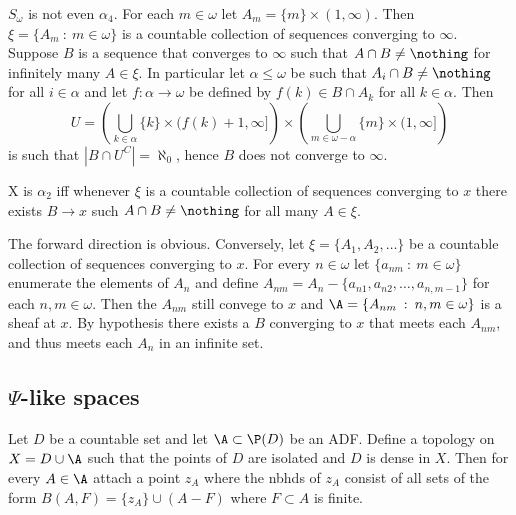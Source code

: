 \documentclass{article}
\begin{document}
\begin{exam}
    \(S_{\omega}\) is not even \(\alpha_4\). For each \(m \in \omega\) let \(A_m = \{m\} \times (1, \infty)\). Then \(\xi = \{A_m \: : \: m \in \omega\}\) is a countable collection of sequences converging to \(\infty\). Suppose \(B\) is a sequence that converges to \(\infty\) such that \(A\cap B \neq \nothing\) for infinitely many \(A \in \xi\). In particular let \(\alpha \leq \omega\) be such that \(A_i \cap B \neq \nothing\) for all \(i \in \alpha\) and let \(f:\alpha \to \omega\) be defined by \(f(k) \in B \cap A_k\) for all \(k \in \alpha\). Then 
    \[
    U = \left(\bigcup_{k \in \alpha} \{k\} \times (f(k) + 1, \infty]\right)\times \left(\bigcup_{m \in \omega-\alpha} \{m\} \times (1, \infty]\right)\] 
    is such that \(|B \cap U^C| = \aleph_0\), hence \(B\) does not converge to \(\infty\). 

\end{exam}

\begin{exercise}{\label{var_alpha2}}
    X is \(\alpha_2\) iff whenever \(\xi\) is a countable collection of sequences converging to \(x\) there exists \(B \to x\) such \(A \cap B \neq \nothing\) for all many \(A \in \xi\).
\end{exercise}
\begin{soln}
    The forward direction is obvious. Conversely, let \(\xi =\{A_1, A_2, \dots\}\) be a countable collection of sequences converging to \(x\). For every \(n\in \omega\) let \(\{a_{nm} \: : \: m \in \omega\}\) enumerate the elements of \(A_n\) and define \(A_{nm} = A_n - \{a_{n1}, a_{n2}, \dots, a_{n,m-1}\}\) for each \(n,m \in \omega\). Then the \(A_{nm}\) still convege to \(x\) and  \(\A = \{A_{nm} \: : \: n,m \in \omega \}\) is a sheaf at \(x\). By hypothesis there exists a \(B\) converging to \(x\) that meets each \(A_{nm}\), and thus meets each \(A_n\) in an infinite set.
\end{soln}

\subsection{\(\Psi\)-like spaces}

\begin{defn}
    Let \(D\) be a countable set and let \(\A \subset \P(D)\) be an ADF. Define a topology on \(X = D \cup \A\) such that the points of \(D\) are isolated and \(D\) is dense in \(X\). Then for every \(A \in \A\) attach a point \(z_A\) where the nbhds of \(z_A\) consist of all sets of the form \(B(A, F) = \{z_A\} \cup (A - F)\) where \(F \subset A\) is finite.
\end{defn}
\end{document}
